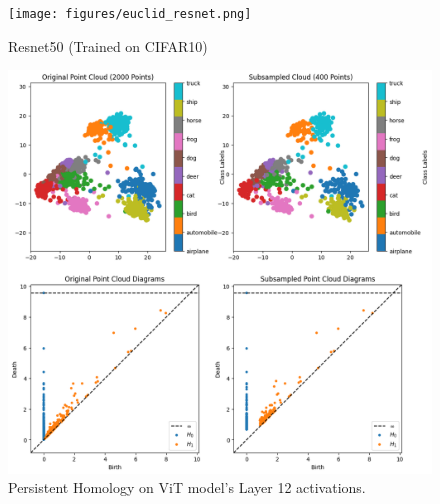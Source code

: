\documentclass[final]{beamer}
\newlength{\colwidth}
\begin{document}
\begin{frame}[t]
\begin{columns}[t]
\begin{column}{\colwidth}
      \begin{figure}[h!]
          \centering
        \begin{minipage}{.45\linewidth}
            \centering
            \texttt{[image: figures/euclid\_resnet.png]}
            \caption{Resnet50 (Trained on CIFAR10)}
        \end{minipage}
          \begin{minipage}{.45\linewidth}
              \centering
            \includegraphics[width=\linewidth]{figures/12_layer_vit.png}
            \caption{ Persistent Homology on ViT model's Layer 12 activations.}
          \end{minipage}


      \end{figure}
  


  
  
  


\end{column}
\end{columns}
\end{frame}
\end{document}
